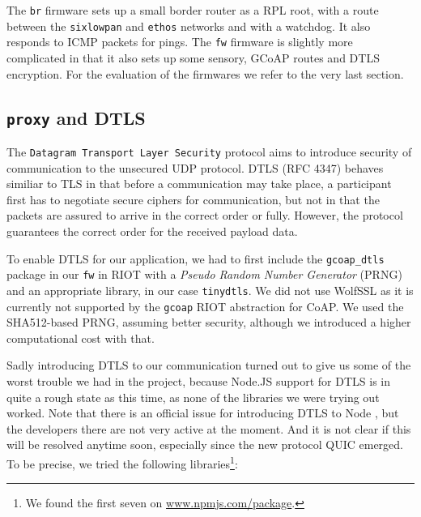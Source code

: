 \documentclass[acmtog, language=english, nonacm]{acmart}
\begin{document}
    The \texttt{br} firmware sets up a small border router as a RPL root, with a route between the \texttt{sixlowpan} and \texttt{ethos} networks and with a watchdog. It also responds to ICMP packets for pings. The \texttt{fw} firmware is slightly more complicated in that it also sets up some sensory, GCoAP routes and DTLS encryption. For the evaluation of the firmwares we refer to the very last section.

    \subsection{\texttt{proxy} and DTLS} \label{subsec:proxy_and_dtls}

    The \texttt{Datagram Transport Layer Security} protocol aims to introduce security of communication to the unsecured UDP protocol. DTLS (RFC 4347) behaves similiar to TLS in that before a communication may take place, a participant first has to negotiate secure ciphers for communication, but not in that the packets are assured to arrive in the correct order or fully. However, the protocol guarantees the correct order for the received payload data.

    To enable DTLS for our application, we had to first include the \texttt{gcoap\_dtls} package in our \texttt{fw} in RIOT with a \emph{Pseudo Random Number Generator} (PRNG) and an appropriate library, in our case \texttt{tinydtls}. We did not use WolfSSL as it is currently not supported by the \texttt{gcoap} RIOT abstraction for CoAP. We used the SHA512-based PRNG, assuming better security, although we introduced a higher computational cost with that.
    
    Sadly introducing DTLS to our communication turned out to give us some of the worst trouble we had in the project, because Node.JS support for DTLS is in quite a rough state as this time, as none of the libraries we were trying out worked. Note that there is an official issue for introducing DTLS to Node \cite{node-dtls-issue}, but the developers there are not very active at the moment. And it is not clear if this will be resolved anytime soon, especially since the new protocol QUIC emerged. To be precise, we tried the following libraries\footnote{We found the first seven on \url{www.npmjs.com/package}.}:
\end{document}
